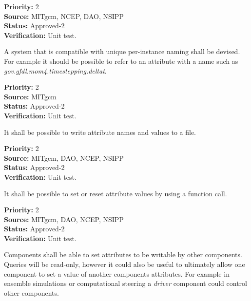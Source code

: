\begin{reqlist}
{\bf Priority:} 2 \\
{\bf Source:} MITgcm, NCEP, DAO, NSIPP \\
{\bf Status:} Approved-2 \\ 
{\bf Verification:} Unit test.\\
\end{reqlist}


A system that is compatible with unique per-instance 
naming shall be devised.  For example it should be possible 
to refer to an attribute with a
name such as {\it gov.gfdl.mom4.timestepping.deltat}. 

\begin{reqlist}
{\bf Priority:} 2 \\
{\bf Source:} MITgcm \\
{\bf Status:} Approved-2 \\ 
{\bf Verification:} Unit test.\\
\end{reqlist}


It shall be possible to write attribute names and values to a file.

\begin{reqlist}
{\bf Priority:} 2 \\
{\bf Source:} MITgcm, DAO, NCEP, NSIPP \\
{\bf Status:} Approved-2 \\ 
{\bf Verification:} Unit test.\\
\end{reqlist}


It shall be possible to set or reset attribute values by using 
a function call.

\begin{reqlist}
{\bf Priority:} 2 \\
{\bf Source:} MITgcm, DAO, NCEP, NSIPP \\
{\bf Status:} Approved-2 \\ 
{\bf Verification:} Unit test.\\
\end{reqlist}

Components shall be able to set attributes to be writable by other components.
Queries will be read-only, however it could also be useful to ultimately allow 
one component to set a value of another components attributes. For example in
ensemble simulations or computational steering a {\it driver} component could
control other components.


